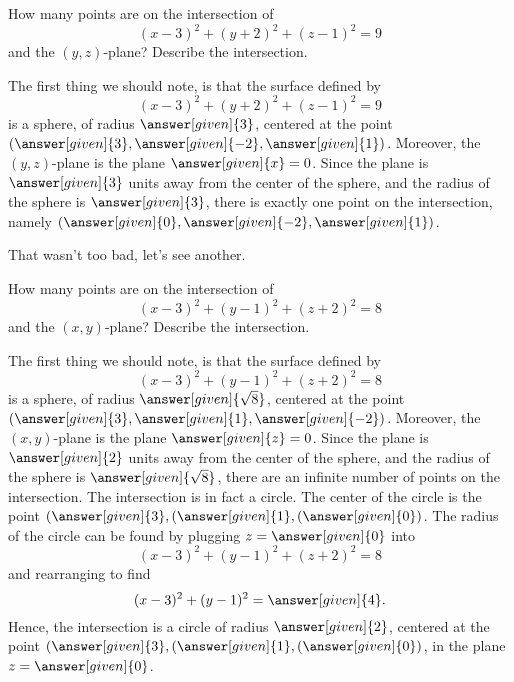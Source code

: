 \documentclass{ximera}
\begin{document}
\begin{example}
  How many points are on the intersection of
  \[
  (x-3)^2 + (y+2)^2 + (z-1)^2 = 9
  \]
  and the $(y,z)$-plane? Describe the intersection.
  \begin{explanation}
    The first thing we should note, is that the surface defined by
    \[
    (x-3)^2 + (y+2)^2 + (z-1)^2 = 9
    \]
    is a sphere, of radius $\answer[given]{3}$, centered at the point
    $(\answer[given]{3},\answer[given]{-2},\answer[given]{1})$. Moreover,
    the $(y,z)$-plane is the plane $\answer[given]{x}=0$. Since the
    plane is $\answer[given]{3}$ units away from the center of the
    sphere, and the radius of the sphere is $\answer[given]{3}$, there
    is exactly one point on the intersection, namely
    $(\answer[given]{0},\answer[given]{-2},\answer[given]{1})$.
  \end{explanation}
\end{example}

That wasn't too bad, let's see another.

\begin{example}
  How many points are on the intersection of
  \[
  (x-3)^2 + (y-1)^2 + (z+2)^2 = 8
  \]
  and the $(x,y)$-plane? Describe the intersection.
  \begin{explanation}
    The first thing we should note, is that the surface defined by
    \[
    (x-3)^2 + (y-1)^2 + (z+2)^2 = 8
    \]
    is a sphere, of radius $\answer[given]{\sqrt{8}}$, centered at the
    point
    $(\answer[given]{3},\answer[given]{1},\answer[given]{-2})$. Moreover,
    the $(x,y)$-plane is the plane $\answer[given]{z}=0$. Since the
    plane is $\answer[given]{2}$ units away from the center of the
    sphere, and the radius of the sphere is
    $\answer[given]{\sqrt{8}}$, there are an infinite number of
    points on the intersection. The intersection is in fact a
    circle. The center of the circle is the point
    $(\answer[given]{3},(\answer[given]{1},(\answer[given]{0})$. The
    radius of the circle can be found by plugging
    $z=\answer[given]{0}$ into
    \[
    (x-3)^2 + (y-1)^2 + (z+2)^2 = 8
    \]
    and rearranging to find
    \[
    (x-3)^2 + (y-1)^2  = \answer[given]{4}.
    \]
    Hence, the intersection is a circle of radius $\answer[given]{2}$,
    centered at the point
    $(\answer[given]{3},(\answer[given]{1},(\answer[given]{0})$, in
    the plane $z=\answer[given]{0}$.
  \end{explanation}
\end{example}
\end{document}
